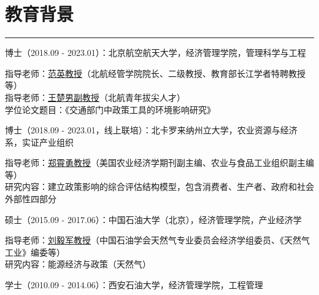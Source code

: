 \documentclass[letterpaper]{article}
\renewenvironment{itemize}{
  \begin{list}{}{
    \setlength{\leftmargin}{0.2in}
    \setlength{\itemsep}{0.15in}
    \setlength{\parskip}{0.05in}
    \setlength{\parsep}{0.05in}
  }
}{
  \end{list}
}
\begin{document}
\section*{教育背景}
\hrule
\vspace{0.25cm}
  \begin{itemize}
    \item 博士（2018.09 - 2023.01）：北京航空航天大学，经济管理学院，管理科学与工程
      \begin{itemize}
        \item 指导老师：\href{http://sem.buaa.edu.cn/szdw/yyjjx/fy/jbxx.htm}{范英教授}（北航经管学院院长、二级教授、教育部长江学者特聘教授等）\\
        指导老师：\href{https://shi.buaa.edu.cn/wangbuaa08/zh_CN/index.htm}{王楚男副教授}（北航青年拔尖人才）\\
        学位论文题目：《交通部门中政策工具的环境影响研究》
      \end{itemize}
    \item 博士（2018.09 - 2023.01，线上联培）：北卡罗来纳州立大学，农业资源与经济系，实证产业组织
      \begin{itemize}
        \item 指导老师：\href{https://cals.ncsu.edu/agricultural-and-resource-economics/people/xiaoyong-zheng/}{郑霄勇教授}（美国农业经济学期刊副主编、农业与食品工业组织副主编等）\\
        研究内容：建立政策影响的综合评估结构模型，包含消费者、生产者、政府和社会外部性四部分
      \end{itemize}
    \item 硕士（2015.09 - 2017.06）：中国石油大学（北京），经济管理学院，产业经济学
      \begin{itemize}
        \item 指导老师：\href{https://www.cup.edu.cn/sba/szdwgb/yyjjxgb/l2/177732.htm}{刘毅军教授}（中国石油学会天然气专业委员会经济学组委员、《天然气工业》编委等）\\
        研究内容：能源经济与政策（天然气）
      \end{itemize}
    \item 学士（2010.09 - 2014.06）：西安石油大学，经济管理学院，工程管理
  \end{itemize}
\end{document}
